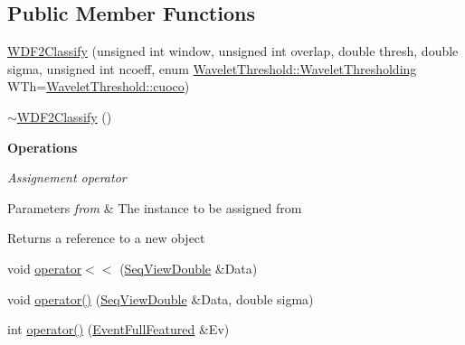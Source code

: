 \subsection*{Public Member Functions}
\begin{DoxyCompactItemize}
\item 
\hyperlink{classtsa_1_1_w_d_f2_classify_a1149d3b3364891a001ed37a78a085932}{W\+D\+F2\+Classify} (unsigned int window, unsigned int overlap, double thresh, double sigma, unsigned int ncoeff, enum \hyperlink{classtsa_1_1_wavelet_threshold_a50c42c95dae960986a985157ca038fae}{Wavelet\+Threshold\+::\+Wavelet\+Thresholding} W\+Th=\hyperlink{classtsa_1_1_wavelet_threshold_a50c42c95dae960986a985157ca038faea849b2c33799f9de0e842f1d935ea3822}{Wavelet\+Threshold\+::cuoco})
\item 
\hyperlink{classtsa_1_1_w_d_f2_classify_aca93650a5449192353412584c67102eb}{$\sim$\+W\+D\+F2\+Classify} ()
\end{DoxyCompactItemize}
\begin{Indent}\textbf{ Operations}\par
{\em Assignement operator


\begin{DoxyParams}{Parameters}
{\em from} & The instance to be assigned from\\
\hline
\end{DoxyParams}
\begin{DoxyReturn}{Returns}
a reference to a new object 
\end{DoxyReturn}
}\begin{DoxyCompactItemize}
\item 
void \hyperlink{classtsa_1_1_w_d_f2_classify_a742b607d6e01e6788ab440caffa7f689}{operator$<$$<$} (\hyperlink{namespacetsa_ac599574bcc094eda25613724b8f3ca9e}{Seq\+View\+Double} \&Data)
\item 
void \hyperlink{classtsa_1_1_w_d_f2_classify_a425a5ecd5ee448ca108c54a2eb489bac}{operator()} (\hyperlink{namespacetsa_ac599574bcc094eda25613724b8f3ca9e}{Seq\+View\+Double} \&Data, double sigma)
\item 
int \hyperlink{classtsa_1_1_w_d_f2_classify_a418bc2df5c22ca0464ea95c461d81b14}{operator()} (\hyperlink{classtsa_1_1_event_full_featured}{Event\+Full\+Featured} \&Ev)
\end{DoxyCompactItemize}
\end{Indent}
